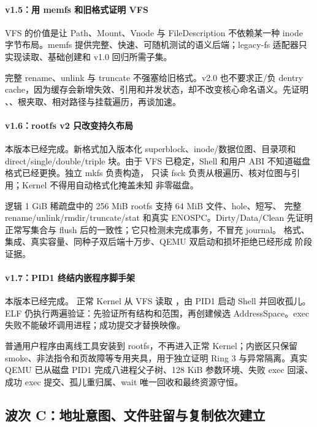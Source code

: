 \paragraph{v1.5：用 memfs 和旧格式证明 VFS}

VFS 的价值是让 Path、Mount、Vnode 与 FileDescription 不依赖某一种 inode
字节布局。memfs 提供完整、快速、可随机测试的语义后端；legacy-fs 适配器只
实现读取、基础创建和 v1.0 回归所需子集。

完整 rename、unlink 与 truncate 不强塞给旧格式。v2.0 也不要求正/负 dentry
cache，因为缓存会新增失效、引用和并发状态，却不改变核心命名语义。先证明
、、根夹取、相对路径与挂载遍历，再谈加速。

\paragraph{v1.6：rootfs v2 只改变持久布局}

本版本已经完成。新格式加入版本化 superblock、inode/数据位图、目录项和
direct/single/double/triple 块。由于
VFS 已稳定，Shell 和用户 ABI 不知道磁盘格式已经更换。独立 mkfs 负责构造，
只读 fsck 负责从根遍历、核对位图与引用；Kernel 不得用自动格式化掩盖未知
非零磁盘。

逻辑 1 GiB 稀疏盘中的 256 MiB rootfs 支持 64 MiB 文件、hole、短写、
完整 rename/unlink/rmdir/truncate/stat 和真实 ENOSPC。Dirty/Data/Clean
先证明正常写集合与 flush 后的一致性；它只检测未完成事务，不冒充 journal。
格式、集成、真实容量、同种子双后端十万步、QEMU 双启动和损坏拒绝已经形成
阶段证据。

\paragraph{v1.7：PID1 终结内嵌程序脚手架}

本版本已经完成。
正常 Kernel 从 VFS 读取 ，由 PID1 启动 Shell 并回收孤儿。
ELF 仍执行两遍验证：先验证所有结构和范围，再创建候选 AddressSpace。exec
失败不能破坏调用进程；成功提交才替换映像。

普通用户程序由离线工具安装到 rootfs，不再进入正常 Kernel；内嵌区只保留
smoke、非法指令和页故障等专用夹具，用于独立证明 Ring 3 与异常隔离。真实
QEMU 已从磁盘 PID1 完成八进程父子树、128 KiB 参数环境、失败 exec 回滚、
成功 exec 提交、孤儿重归属、wait 唯一回收和最终资源守恒。

\subsection{波次 C：地址意图、文件驻留与复制依次建立}

